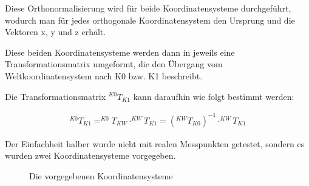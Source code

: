 \documentclass[11pt, a4paper]{article}
\begin{document}
Diese Orthonormalisierung wird für beide Koordinatensysteme durchgeführt, wodurch man für jedes orthogonale Koordinatensystem den Ursprung und die Vektoren x, y und z erhält.

Diese beiden Koordinatensysteme werden dann in jeweils eine Transformationsmatrix umgeformt, die den Übergang vom Weltkoordinatensystem nach K0 bzw. K1 beschreibt.

Die Transformationsmatrix $^{K0}T_{K1}$ kann daraufhin wie folgt bestimmt werden:

\begin{eqnarray*}
^{K0}T_{K1} = ^{K0}T_{KW} \cdot ^{KW}T_{K1} = (^{KW}T_{K0})^{-1} \cdot ^{KW}T_{K1}
\end{eqnarray*}



Der Einfachheit halber wurde nicht mit realen Messpunkten getestet, sondern es wurden zwei Koordinatensysteme vorgegeben.

\begin{figure}[H]
\center{}
\caption{Die vorgegebenen Koordinatensysteme}
\end{figure}






\end{document}
